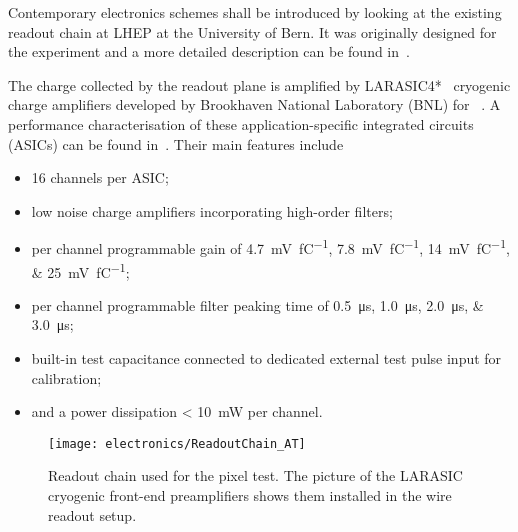 Contemporary electronics schemes shall be introduced by looking at the existing readout chain at LHEP at the University of Bern.
It was originally designed for the \AT{} experiment and a more detailed description can be found in~\cite{AT_larasic}.

The charge collected by the readout plane is amplified by LARASIC4*~\cite{larasic} cryogenic charge amplifiers developed by Brookhaven National Laboratory (BNL) for \uboone{}~\cite{uboone}.
A performance characterisation of these application-specific integrated circuits (ASICs) can be found in~\cite{AT_larasic}.
Their main features include

\begin{itemize}
	\item \num{16} channels per ASIC;
	\item low noise charge amplifiers incorporating high-order filters;
	\item per channel programmable gain of \SIlist[list-final-separator = { or }]{4.7; 7.8; 14; 25}{\milli\volt\per\femto\coulomb};
	\item per channel programmable filter peaking time of \SIlist[list-final-separator = { or }]{0.5; 1.0; 2.0; 3.0}{\micro\second};
	\item built-in test capacitance connected to dedicated external test pulse input for calibration;
	\item and a power dissipation \SI{< 10}{\milli\watt} per channel.
\end{itemize}

\begin{figure}[htb]
	\centering
	\texttt{[image: electronics/ReadoutChain\_AT]}
	\caption{Readout chain used for the pixel test.
		The picture of the LARASIC cryogenic front-end preamplifiers shows them installed in the \AT{} wire readout setup.~\cite{AT_larasic}}
	\label{fig:viper_readoutChain_AT}
\end{figure}

